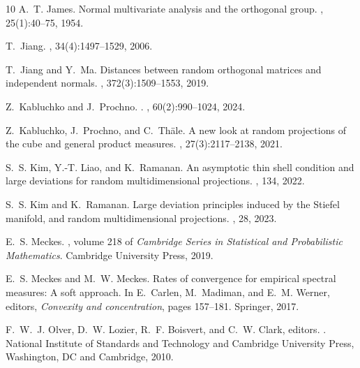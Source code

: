 \documentclass[11pt,a4paper,twoside]{article}
\theoremstyle{definition}
\begin{document}
\begin{thebibliography}{10}
A.~T. James.
\newblock Normal multivariate analysis and the orthogonal group.
, 25(1):40--75, 1954.

T.~Jiang.
, 34(4):1497--1529, 2006.

T.~Jiang and Y.~Ma.
\newblock Distances between random orthogonal matrices and independent normals.
, 372(3):1509--1553, 2019.

Z.~Kabluchko and J.~Prochno.
.
, 60(2):990--1024, 2024.

Z.~Kabluchko, J.~Prochno, and C.~Th{\"a}le.
\newblock A new look at random projections of the cube and general product measures.
, 27(3):2117--2138, 2021.

S.~S. Kim, Y.-T. Liao, and K.~Ramanan.
\newblock An asymptotic thin shell condition and large deviations for random multidimensional projections.
, 134, 2022.

S.~S. Kim and K.~Ramanan.
\newblock Large deviation principles induced by the {Stiefel} manifold, and random multidimensional projections.
, 28, 2023.

E.~S. Meckes.
, volume 218 of {\em Cambridge Series in Statistical and Probabilistic Mathematics}.
\newblock Cambridge University Press, 2019.

E.~S. Meckes and M.~W. Meckes.
\newblock Rates of convergence for empirical spectral measures: A soft approach.
\newblock In E.~Carlen, M.~Madiman, and E.~M. Werner, editors, {\em Convexity and concentration}, pages 157--181. Springer, 2017.

F.~W.~J. Olver, D.~W. Lozier, R.~F. Boisvert, and C.~W. Clark, editors.
.
\newblock National Institute of Standards and Technology and Cambridge University Press, Washington, DC and Cambridge, 2010.


\end{thebibliography}
\end{document}
